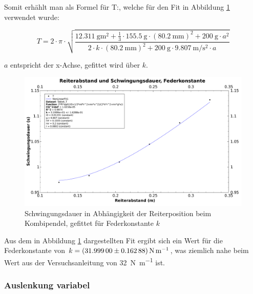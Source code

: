 \clearpage
Somit erh\"ahlt man als Formel f\"ur T:, welche f\"ur den Fit in Abbildung \ref{fig:331a}
verwendet wurde:

\begin{equation}
    T = 2 \cdot \pi \cdot \sqrt{\frac{\SI{12.311}{\gram\meter\squared} + \frac{1}{3} \cdot \SI{155.5}{\gram} \cdot (\SI{80.2}{\milli\meter})^2 + \SI{200}{\gram} \cdot a^2}{2 \cdot k \cdot (\SI{80.2}{\milli\meter})^2 + \SI{200}{\gram} \cdot
    \SI{9.807}{\meter\per\second\squared} \cdot a}}
\end{equation}

$a$ entspricht der x-Achse, gefittet wird \"uber $k$.

\begin{figure}[h!]
    \centering
    \includegraphics[width=\textwidth]{images/331a.pdf}
    \caption{%
        Schwingungsdauer in Abh\"angigkeit der Reiterposition beim Kombipendel, gefittet f\"ur Federkonstante $k$
    }
    \label{fig:331a}
\end{figure}

Aus dem  in Abbildung  \ref{fig:331a} dargestellten Fit  ergibt sich  ein Wert
f\"ur die  Federkonstante von  $k = \SI[separate-uncertainty  = true]{31.999
\pm  0.16288}{\newton\per\meter}$,  was  ziemlich   nahe  beim  Wert  aus  der
Versuchsanleitung von \SI{32}{\newton\per\meter} ist.


\clearpage
\subsubsection{Auslenkung variabel}
\label{subsubsec:kombiP:auslvar}

